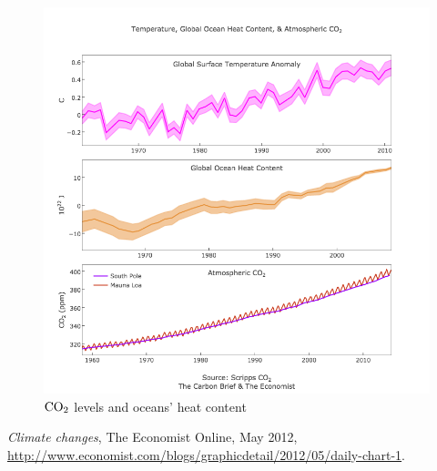 \documentclass[11pt,1column]{article}
\begin{document}
\begin{figure}[H]
\begin{center}
\includegraphics[width=\textwidth]{./Figures/AtmosphericCO2.png}
\caption{$\hbox{CO}_2$ levels and oceans' heat content}
\label{fig:CO2_heat}
\end{center}
\end{figure}


\begin{thebibliography}{00}
  \emph{Climate changes}, The Economist Online, May 2012,  \url{http://www.economist.com/blogs/graphicdetail/2012/05/daily-chart-1}.
\end{thebibliography}
\end{document}
